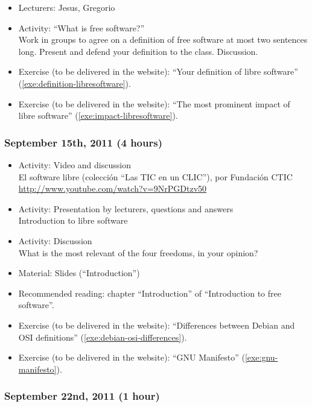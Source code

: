 \documentclass[a4paper]{article}
\begin{document}
\begin{itemize}
\item Lecturers: Jesus, Gregorio
\item Activity: ``What is free software?'' \\
  Work in groups to agree on a definition of free software at most two sentences long. Present and defend your definition to the class. Discussion.
\item Exercise (to be delivered in the website): ``Your definition of libre software'' (\ref{exe:definition-libresoftware}).
\item Exercise (to be delivered in the website): ``The most prominent impact of libre software'' (\ref{exe:impact-libresoftware}).
\end{itemize}

\subsubsection{September 15th, 2011 (4 hours)}

\begin{itemize}
\item Activity: Video and discussion \\
  El software libre (colección ``Las TIC en un CLIC''), por Fundación CTIC \\
  \url{http://www.youtube.com/watch?v=9NrPGDtzv50}
\item Activity: Presentation by lecturers, questions and answers \\
  Introduction to libre software
\item Activity: Discussion \\
  What is the most relevant of the four freedoms, in your opinion?
\item Material: Slides (``Introduction'')
\item Recommended reading: chapter ``Introduction'' of ``Introduction to free software''.
\item Exercise (to be delivered in the website): ``Differences between Debian and OSI definitions'' (\ref{exe:debian-osi-differences}).
\item Exercise (to be delivered in the website): ``GNU Manifesto'' (\ref{exe:gnu-manifesto}).
\end{itemize}

\subsubsection{September 22nd, 2011 (1 hour)}
\end{document}
